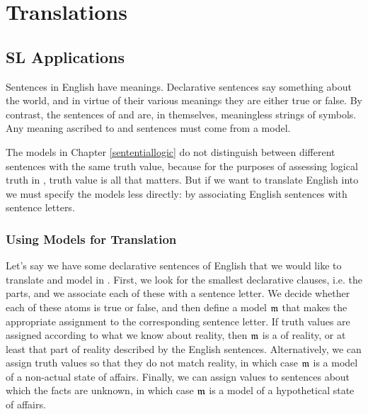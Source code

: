 \chapter{Translations}\label{Translations}

\section{SL Applications}\label{SLApplications}


Sentences in English have meanings.
Declarative sentences say something about the world, and in virtue of their various meanings they are either true or false.
By contrast, the sentences of \GSL{} and \GQL{} are, in themselves, meaningless strings of symbols.
Any meaning ascribed to \GSL{} and \GQL{} sentences must come from a model.

The models in Chapter \ref{sententiallogic} do not distinguish between different sentences with the same truth value, because for the purposes of assessing logical truth in \GSL{}, truth value is all that matters.
But if we want to translate English into \GSL{} we must specify the models less directly: by associating English sentences with sentence letters.

\subsection{Using \GSL{} Models for Translation}\label{GSLTranslationModels}

Let's say we have some declarative sentences of English that we would like to translate and model in \GSL{}.
First, we look for the smallest declarative clauses, i.e. the  parts, and we associate each of these with a sentence letter.
We decide whether each of these atoms is true or false, and then define a model $\mathfrak{m}$ that makes the appropriate assignment to the corresponding sentence letter.
If truth values are assigned according to what we know about reality, then $\mathfrak{m}$ is a  of reality, or at least that part of reality described by the English sentences.
Alternatively, we can assign truth values so that they do not match reality, in which case $\mathfrak{m}$ is a model of a non-actual state of affairs.
Finally, we can assign values to sentences about which the facts are unknown, in which case $\mathfrak{m}$ is a model of a hypothetical state of affairs.

